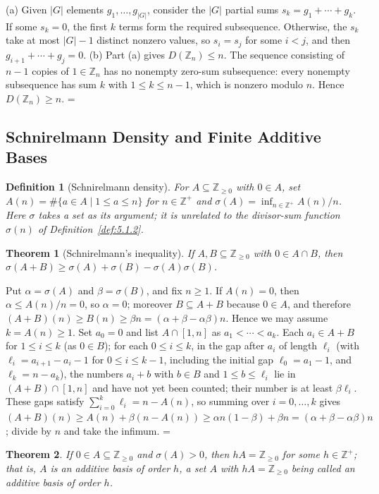 \documentclass[11pt]{article}
\makeatletter
\theoremstyle{ntstyle}
\newtheorem{theorem}{Theorem}[subsection]
\newtheorem{definition}{Definition}[subsection]
\let\nt@closedisplay\]
\def\nt@guardedclose{\@ifnextchar\par{\nt@closeafterpar}{\@ifnextchar\end{\postdisplaypenalty\@M\nt@closedisplay}{\nt@closedisplay}}}
\def\nt@closeafterpar\par{\@ifnextchar\par{\nt@closeafterpar}{\@ifnextchar\end{\postdisplaypenalty\@M\nt@closedisplay\par}{\nt@closedisplay\par}}}
\renewenvironment{proof}[1][\proofname]{\par
  \pushQED{\qed}\normalfont\topsep\medskipamount\edef\nt@afterproof{\@endparpenalty=\the\@endparpenalty\relax}\@beginparpenalty\@M\@endparpenalty\@M\let\]\nt@guardedclose\trivlist\item[]\textit{#1\@addpunct{.}} \ignorespaces}{\ifvmode\addpenalty\@M\fi\popQED\nt@afterproof\endtrivlist\@endpefalse}
\makeatother
\begin{document}
\begin{proof} (a) Given $|G|$ elements $g_1, \ldots,
		g_{|G|}$, consider the $|G|$ partial sums $s_k = g_1 + \cdots + g_k$.
	If some $s_k = 0$, the first $k$ terms form the required subsequence.
	Otherwise, the $s_k$ take at most $|G| - 1$ distinct nonzero values,
	so $s_i = s_j$ for some $i < j$, and then $g_{i+1} + \cdots + g_j =
		0$. (b) Part (a) gives $D(\mathbb{Z}_n)\le n$. The sequence
	consisting of $n - 1$ copies of $1\in\mathbb{Z}_n$ has no nonempty
	zero-sum subsequence: every nonempty subsequence has sum $k$ with
	$1\le k\le n - 1$, which is nonzero modulo $n$. Hence
	$D(\mathbb{Z}_n)\ge n$.
\end{proof}
\subsection{Schnirelmann Density and Finite Additive Bases}

\begin{definition}[Schnirelmann density]\label{def:12.4.1} For
	$A\subseteq\mathbb{Z}_{\ge0}$ with $0\in A$, set $A(n)=\#\{a\in
		A \mid 1\le a\le n\}$ for $n\in\mathbb{Z}^+$ and
	$\sigma(A)=\inf_{n\in\mathbb{Z}^+}A(n)/n$. Here $\sigma$
	takes a set as its argument; it is unrelated to the divisor-sum function
	$\sigma(n)$ of Definition~\ref{def:5.1.2}.
\end{definition}
\begin{theorem}[Schnirelmann's inequality]\label{thm:12.4.1} If
	$A,B\subseteq\mathbb{Z}_{\ge0}$ with $0\in A\cap B$, then $\sigma(A+B)\ge\sigma(A)+\sigma(B)-\sigma(A)\sigma(B)$.
\end{theorem}

\begin{proof} Put $\alpha=\sigma(A)$ and
	$\beta=\sigma(B)$, and fix $n\ge1$. If $A(n)=0$, then
	$\alpha\le A(n)/n=0$, so $\alpha=0$; moreover $B\subseteq A+B$
	because $0\in A$, and therefore
	$(A+B)(n)\ge B(n)\ge\beta n=(\alpha+\beta-\alpha\beta)n$.
	Hence we may assume $k=A(n)\ge1$. Set $a_0=0$ and list
	$A\cap[1,n]$ as $a_1<\cdots<a_k$. Each
	$a_i\in A+B$ for $1\le i\le k$ (as $0\in B$); for each $0\le i\le k$, in the gap after $a_i$ of length
	$\ell_i$ (with $\ell_i=a_{i+1}-a_i-1$ for $0\le i\le k-1$, including
	the initial gap $\ell_0=a_1-1$, and $\ell_k=n-a_k$), the numbers $a_i+b$ with $b\in
		B$ and $1\le b\le\ell_i$ lie in $(A+B)\cap[1,n]$ and have not yet been counted; their number is
	at least $\beta\ell_i$. These gaps satisfy
	$\sum_{i=0}^{k}\ell_i=n-A(n)$, so summing over $i=0,\ldots,k$ gives $(A+B)(n)\ge A(n)+\beta(n-A(n))\ge\alpha
		n(1-\beta)+\beta n=(\alpha+\beta-\alpha\beta)n$; divide by $n$ and
	take the infimum.\qedhere
\end{proof}
\begin{theorem}\label{thm:12.4.2}
	If $0\in A\subseteq\mathbb{Z}_{\ge0}$ and $\sigma(A)>0$, then $hA=\mathbb{Z}_{\ge0}$ for some
	$h\in\mathbb{Z}^+$; that is, $A$ is an additive basis of order $h$, a set $A$ with
	$hA=\mathbb{Z}_{\ge0}$ being called an additive basis of order $h$.
\end{theorem}
\end{document}
